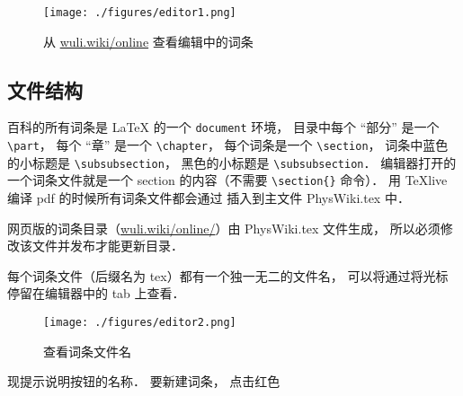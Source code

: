 \begin{figure}[ht]
\centering
\texttt{[image: ./figures/editor1.png]}
\caption{从 \href{http://wuli.wiki/online}{wuli.wiki/online} 查看编辑中的词条} \label{editor_fig1}
\end{figure}

\subsection{文件结构}

百科的所有词条是 LaTeX 的一个 \lstinline|document| 环境， 目录中每个 “部分” 是一个 \lstinline|\part|， 每个 “章” 是一个 \lstinline|\chapter|， 每个词条是一个 \lstinline|\section|， 词条中蓝色的小标题是 \lstinline|\subsubsection|， 黑色的小标题是 \lstinline|\subsubsection|． 编辑器打开的一个词条文件就是一个 section 的内容（不需要 \lstinline|\section{}| 命令）． 用 TeXlive 编译 pdf 的时候所有词条文件都会通过 \lstinline|| 插入到主文件 PhysWiki.tex 中．

网页版的词条目录（\href{http://wuli.wiki/online/}{wuli.wiki/online/}）由 PhysWiki.tex 文件生成， 所以必须修改该文件并发布才能更新目录．

每个词条文件（后缀名为 tex）都有一个独一无二的文件名， 可以将通过将光标停留在编辑器中的 tab 上查看．

\begin{figure}[ht]
\centering
\texttt{[image: ./figures/editor2.png]}
\caption{查看词条文件名} \label{editor_fig2}
\end{figure}现提示说明按钮的名称． 要新建词条， 点击红色

